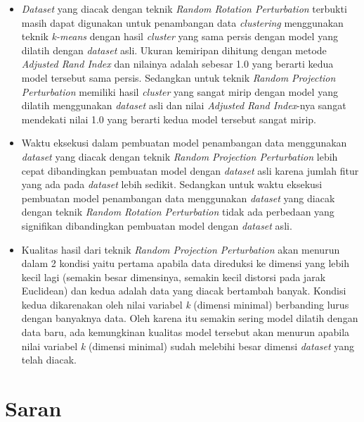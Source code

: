\begin{itemize}
    \item \textit{Dataset} yang diacak dengan teknik \textit{Random Rotation Perturbation} terbukti masih dapat digunakan untuk penambangan data \textit{clustering} menggunakan teknik \textit{k-means} dengan hasil \textit{cluster} yang sama persis dengan model yang dilatih dengan \textit{dataset} asli. Ukuran kemiripan dihitung dengan metode \textit{Adjusted Rand Index} dan nilainya adalah sebesar 1.0 yang berarti kedua model tersebut sama persis. Sedangkan untuk teknik \textit{Random Projection Perturbation} memiliki hasil \textit{cluster} yang sangat mirip dengan model yang dilatih menggunakan \textit{dataset} asli dan nilai \textit{Adjusted Rand Index}-nya sangat mendekati nilai 1.0 yang berarti kedua model tersebut sangat mirip.
    \item Waktu eksekusi dalam pembuatan model penambangan data menggunakan \textit{dataset} yang diacak dengan teknik \textit{Random Projection Perturbation} lebih cepat dibandingkan pembuatan model dengan \textit{dataset} asli karena jumlah fitur yang ada pada \textit{dataset} lebih sedikit. Sedangkan untuk waktu eksekusi pembuatan model penambangan data menggunakan \textit{dataset} yang diacak dengan teknik \textit{Random Rotation Perturbation} tidak ada perbedaan yang signifikan dibandingkan pembuatan model dengan \textit{dataset} asli.
    \item Kualitas hasil dari teknik \textit{Random Projection Perturbation} akan menurun dalam 2 kondisi yaitu pertama apabila data direduksi ke dimensi yang lebih kecil lagi (semakin besar dimensinya, semakin kecil distorsi pada jarak Euclidean) dan kedua adalah data yang diacak bertambah banyak. Kondisi kedua dikarenakan oleh nilai variabel \textit{k} (dimensi minimal) berbanding lurus dengan banyaknya data. Oleh karena itu semakin sering model dilatih dengan data baru, ada kemungkinan kualitas model tersebut akan menurun apabila nilai variabel \textit{k} (dimensi minimal) sudah melebihi besar dimensi \textit{dataset} yang telah diacak.
\end{itemize}

\section{Saran}
\label{sec:saran}

